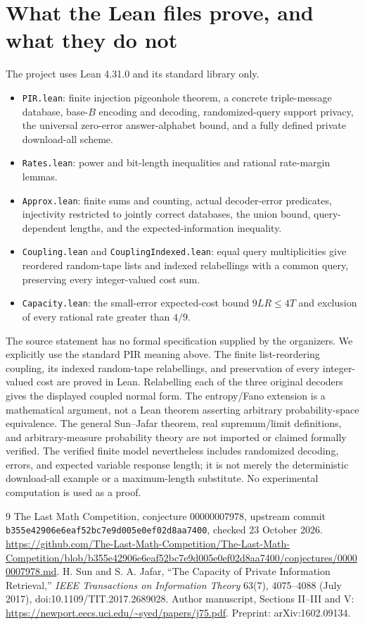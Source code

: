 \documentclass[11pt]{article}
\begin{document}
\section{What the Lean files prove, and what they do not}
The project uses Lean 4.31.0 and its standard library only.
\begin{itemize}
\item \texttt{PIR.lean}: finite injection pigeonhole theorem, a concrete triple-message database, base-$B$ encoding and decoding, randomized-query support privacy, the universal zero-error answer-alphabet bound, and a fully defined private download-all scheme.
\item \texttt{Rates.lean}: power and bit-length inequalities and rational rate-margin lemmas.
\item \texttt{Approx.lean}: finite sums and counting, actual decoder-error predicates, injectivity restricted to jointly correct databases, the union bound, query-dependent lengths, and the expected-information inequality.
\item \texttt{Coupling.lean} and \texttt{CouplingIndexed.lean}: equal query multiplicities give reordered random-tape lists and indexed relabellings with a common query, preserving every integer-valued cost sum.
\item \texttt{Capacity.lean}: the small-error expected-cost bound $9LR\le4T$ and exclusion of every rational rate greater than $4/9$.
\end{itemize}
The source statement has no formal specification supplied by the organizers. We explicitly use the standard PIR meaning above. The finite list-reordering coupling, its indexed random-tape relabellings, and preservation of every integer-valued cost are proved in Lean. Relabelling each of the three original decoders gives the displayed coupled normal form. The entropy/Fano extension is a mathematical argument, not a Lean theorem asserting arbitrary probability-space equivalence. The general Sun--Jafar theorem, real supremum/limit definitions, and arbitrary-measure probability theory are not imported or claimed formally verified. The verified finite model nevertheless includes randomized decoding, errors, and expected variable response length; it is not merely the deterministic download-all example or a maximum-length substitute. No experimental computation is used as a proof.

\begin{thebibliography}{9}
 The Last Math Competition, conjecture 00000007978, upstream commit \texttt{b355e42906e6eaf52bc7e9d005e0ef02d8aa7400}, checked 23 October 2026. \url{https://github.com/The-Last-Math-Competition/The-Last-Math-Competition/blob/b355e42906e6eaf52bc7e9d005e0ef02d8aa7400/conjectures/00000007978.md}.
 H. Sun and S. A. Jafar, ``The Capacity of Private Information Retrieval,'' \emph{IEEE Transactions on Information Theory} 63(7), 4075--4088 (July 2017), doi:10.1109/TIT.2017.2689028. Author manuscript, Sections II--III and V: \url{https://newport.eecs.uci.edu/~syed/papers/j75.pdf}. Preprint: arXiv:1602.09134.
\end{thebibliography}
\end{document}
